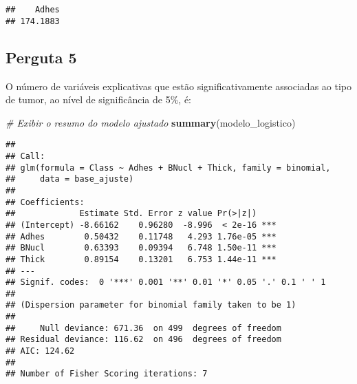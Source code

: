 \documentclass[
]{article}
\newenvironment{Shaded}{\begin{snugshade}}{\end{snugshade}}
\newcommand{\CommentTok}[1]{\textcolor[rgb]{0.56,0.35,0.01}{\textit{#1}}}
\newcommand{\FloatTok}[1]{\textcolor[rgb]{0.00,0.00,0.81}{#1}}
\newcommand{\FunctionTok}[1]{\textcolor[rgb]{0.13,0.29,0.53}{\textbf{#1}}}
\newcommand{\NormalTok}[1]{#1}
\newcommand{\OtherTok}[1]{\textcolor[rgb]{0.56,0.35,0.01}{#1}}
\newcommand{\SpecialCharTok}[1]{\textcolor[rgb]{0.81,0.36,0.00}{\textbf{#1}}}
\newcommand{\StringTok}[1]{\textcolor[rgb]{0.31,0.60,0.02}{#1}}
\begin{document}
\begin{verbatim}
##    Adhes 
## 174.1883
\end{verbatim}

\subsection{Perguta 5}\label{perguta-5}

O número de variáveis explicativas que estão significativamente
associadas ao tipo de tumor, ao nível de significância de 5\%, é:

\begin{Shaded}
\begin{Highlighting}[]
\CommentTok{\# Exibir o resumo do modelo ajustado}
\FunctionTok{summary}\NormalTok{(modelo\_logistico)}
\end{Highlighting}
\end{Shaded}

\begin{verbatim}
## 
## Call:
## glm(formula = Class ~ Adhes + BNucl + Thick, family = binomial, 
##     data = base_ajuste)
## 
## Coefficients:
##             Estimate Std. Error z value Pr(>|z|)    
## (Intercept) -8.66162    0.96280  -8.996  < 2e-16 ***
## Adhes        0.50432    0.11748   4.293 1.76e-05 ***
## BNucl        0.63393    0.09394   6.748 1.50e-11 ***
## Thick        0.89154    0.13201   6.753 1.44e-11 ***
## ---
## Signif. codes:  0 '***' 0.001 '**' 0.01 '*' 0.05 '.' 0.1 ' ' 1
## 
## (Dispersion parameter for binomial family taken to be 1)
## 
##     Null deviance: 671.36  on 499  degrees of freedom
## Residual deviance: 116.62  on 496  degrees of freedom
## AIC: 124.62
## 
## Number of Fisher Scoring iterations: 7
\end{verbatim}

\begin{Shaded}
\end{Shaded}
\end{document}
